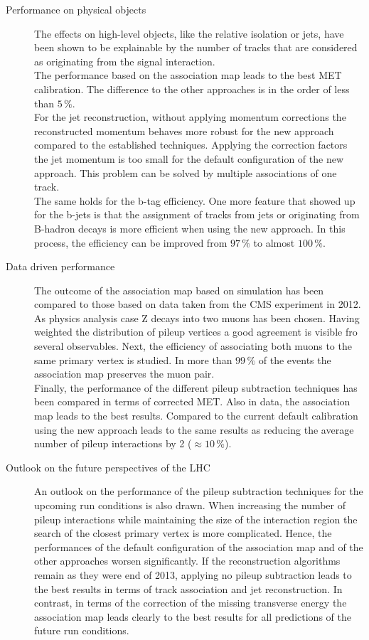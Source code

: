 \begin{description}
\item[Performance on physical objects] The effects on high-level objects, like the relative isolation or jets, have been shown to be explainable by the number of tracks that are considered as originating from the signal interaction. \\
The performance based on the association map leads to the best MET calibration. The difference to the other approaches is in the order of less than $5\,\%$. \\
For the jet reconstruction, without applying momentum corrections the reconstructed momentum behaves more robust for the new approach compared to the established techniques. Applying the correction factors the jet momentum is too small for the default configuration of the new approach. This problem can be solved by multiple associations of one track. \\
The same holds for the b-tag efficiency. One more feature that showed up for the b-jets is that the assignment of tracks from jets or originating from B-hadron decays is more efficient when using the new approach. In this process, the efficiency can be improved from $97\,\%$ to almost $100\,\%$.

\item[Data driven performance] The outcome of the association map based on simulation has been compared to those based on data taken from the CMS experiment in 2012. As physics analysis case Z decays into two muons has been chosen. Having weighted the distribution of pileup vertices a good agreement is visible fro several observables. Next, the efficiency of associating both muons to the same primary vertex is studied. In more than $99\,\%$ of the events the association map preserves the muon pair. \\
Finally, the performance of the different pileup subtraction techniques has been compared in terms of corrected MET. Also in data, the association map leads to the best results. Compared to the current default calibration using the new approach leads to the same results as reducing the average number of pileup interactions by 2 ($\approx10\,\%$).

\item[Outlook on the future perspectives of the LHC] An outlook on the performance of the pileup subtraction techniques for the upcoming run conditions is also drawn. When increasing the number of pileup interactions while maintaining the size of the interaction region the search of the closest primary vertex is more complicated. Hence, the performances of the default configuration of the association map and of the other approaches worsen significantly. If the reconstruction algorithms remain as they were end of 2013, applying no pileup subtraction leads to the best results in terms of track association and jet reconstruction. In contrast, in terms of the correction of the missing transverse energy the association map leads clearly to the best results for all predictions of the future run conditions.

\end{description}


